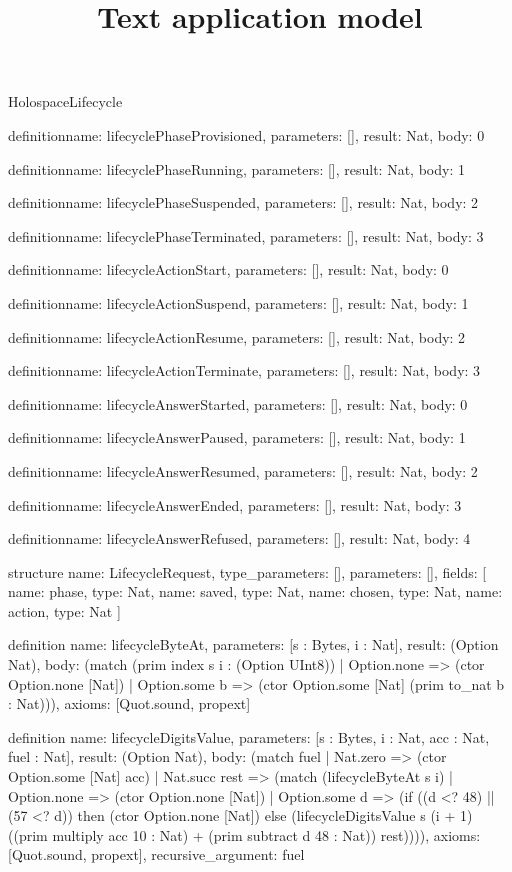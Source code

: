 \begin{lexlean}{HolospaceLifecycle}
\title{Text application model}
\begin{semanticmodule}
definition{name: lifecyclePhaseProvisioned, parameters: [], result: Nat, body: 0}

definition{name: lifecyclePhaseRunning, parameters: [], result: Nat, body: 1}

definition{name: lifecyclePhaseSuspended, parameters: [], result: Nat, body: 2}

definition{name: lifecyclePhaseTerminated, parameters: [], result: Nat, body: 3}

definition{name: lifecycleActionStart, parameters: [], result: Nat, body: 0}

definition{name: lifecycleActionSuspend, parameters: [], result: Nat, body: 1}

definition{name: lifecycleActionResume, parameters: [], result: Nat, body: 2}

definition{name: lifecycleActionTerminate, parameters: [], result: Nat, body: 3}

definition{name: lifecycleAnswerStarted, parameters: [], result: Nat, body: 0}

definition{name: lifecycleAnswerPaused, parameters: [], result: Nat, body: 1}

definition{name: lifecycleAnswerResumed, parameters: [], result: Nat, body: 2}

definition{name: lifecycleAnswerEnded, parameters: [], result: Nat, body: 3}

definition{name: lifecycleAnswerRefused, parameters: [], result: Nat, body: 4}

structure{
  name: LifecycleRequest,
  type_parameters: [],
  parameters: [],
  fields: [
    {name: phase, type: Nat},
    {name: saved, type: Nat},
    {name: chosen, type: Nat},
    {name: action, type: Nat}
  ]
}

definition{
  name: lifecycleByteAt,
  parameters: [s : Bytes, i : Nat],
  result: (Option Nat),
  body: (match (prim index s i : (Option UInt8))
    | Option.none => (ctor Option.none [Nat])
    | Option.some b => (ctor Option.some [Nat] (prim to_nat b : Nat))),
  axioms: [Quot.sound, propext]
}

definition{
  name: lifecycleDigitsValue,
  parameters: [s : Bytes, i : Nat, acc : Nat, fuel : Nat],
  result: (Option Nat),
  body: (match fuel
    | Nat.zero => (ctor Option.some [Nat] acc)
    | Nat.succ rest => (match (lifecycleByteAt s i)
      | Option.none => (ctor Option.none [Nat])
      | Option.some d => (if ((d <? 48) || (57 <? d)) then (ctor Option.none [Nat]) else (lifecycleDigitsValue s (i + 1) ((prim multiply acc 10 : Nat) + (prim subtract d 48 : Nat)) rest)))),
  axioms: [Quot.sound, propext],
  recursive_argument: fuel
}


\end{semanticmodule}
\end{lexlean}
